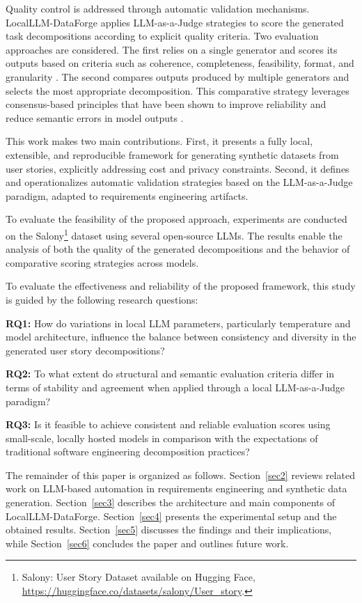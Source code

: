 \documentclass[pdflatex,sn-mathphys-num]{sn-jnl}
\theoremstyle{thmstyleone}%
\theoremstyle{thmstyletwo}%
\theoremstyle{thmstylethree}%
\begin{document}
Quality control is addressed through automatic validation mechanisms. LocalLLM-DataForge applies LLM-as-a-Judge strategies to score the generated task decompositions according to explicit quality criteria. Two evaluation approaches are considered. The first relies on a single generator and scores its outputs based on criteria such as coherence, completeness, feasibility, format, and granularity \cite{chiang2023}. The second compares outputs produced by multiple generators and selects the most appropriate decomposition. This comparative strategy leverages consensus-based principles that have been shown to improve reliability and reduce semantic errors in model outputs \cite{wang2023, li2024}.

This work makes two main contributions. First, it presents a fully local, extensible, and reproducible framework for generating synthetic datasets from user stories, explicitly addressing cost and privacy constraints. Second, it defines and operationalizes automatic validation strategies based on the LLM-as-a-Judge paradigm, adapted to requirements engineering artifacts.

To evaluate the feasibility of the proposed approach, experiments are conducted on the Salony\footnote{Salony: User Story Dataset available on Hugging Face, \url{https://huggingface.co/datasets/salony/User_story}.} dataset using several open-source LLMs. The results enable the analysis of both the quality of the generated decompositions and the behavior of comparative scoring strategies across models.

To evaluate the effectiveness and reliability of the proposed framework, this study is guided by the following research questions:

\textbf{RQ1:} How do variations in local LLM parameters, particularly temperature and model architecture, influence the balance between consistency and diversity in the generated user story decompositions?

\textbf{RQ2:} To what extent do structural and semantic evaluation criteria differ in terms of stability and agreement when applied through a local LLM-as-a-Judge paradigm?

\textbf{RQ3:} Is it feasible to achieve consistent and reliable evaluation scores using small-scale, locally hosted models in comparison with the expectations of traditional software engineering decomposition practices?

The remainder of this paper is organized as follows. Section~\ref{sec2} reviews related work on LLM-based automation in requirements engineering and synthetic data generation. Section~\ref{sec3} describes the architecture and main components of LocalLLM-DataForge. Section~\ref{sec4} presents the experimental setup and the obtained results. Section~\ref{sec5} discusses the findings and their implications, while Section~\ref{sec6} concludes the paper and outlines future work.
\end{document}

